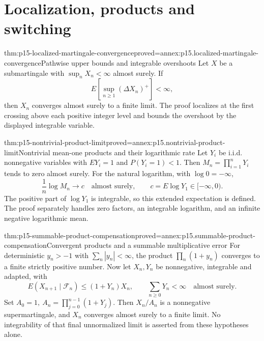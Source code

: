 \section{Localization, products and switching}
\label{sec:p15-martingale-refinements}

\begin{hbtheorem}{thm:p15-localized-martingale-convergence}{proved=annex:p15.localized-martingale-convergence}{Pathwise upper bounds and integrable overshoots}
Let \(X\) be a submartingale with \(\sup_nX_n<\infty\) almost surely.
If
\[
                             E\left[\sup_{n\geq1}(\Delta X_n)^+\right]<\infty,
\]
then \(X_n\) converges almost surely to a finite limit.
The proof localizes at the first crossing above each positive integer
level and bounds the overshoot by the displayed integrable variable.
\end{hbtheorem}

\begin{hbtheorem}{thm:p15-nontrivial-product-limit}{proved=annex:p15.nontrivial-product-limit}{Nontrivial mean-one products and their logarithmic rate}
Let \(Y_i\) be i.i.d. nonnegative variables with \(EY_i=1\) and
\(P(Y_i=1)<1\). Then \(M_n=\prod_{i=1}^nY_i\) tends to zero almost surely.
For the natural logarithm, with \(\log0=-\infty\),
\[
                         \frac1n\log M_n\longrightarrow c
                                      \quad\text{almost surely},
 \qquad c=E\log Y_1\in[-\infty,0).
\]
The positive part of \(\log Y_1\) is integrable, so this extended
expectation is defined. The proof separately handles zero factors,
an integrable logarithm, and an infinite negative logarithmic mean.
\end{hbtheorem}

\begin{hbtheorem}{thm:p15-summable-product-compensation}{proved=annex:p15.summable-product-compensation}{Convergent products and a summable multiplicative error}
For deterministic \(y_n>-1\) with \(\sum_n|y_n|<\infty\),
the product \(\prod_n(1+y_n)\) converges to a finite strictly positive number.
Now let \(X_n,Y_n\) be nonnegative, integrable and adapted, with
\[
                E(X_{n+1}\mid\mathcal F_n)\leq(1+Y_n)X_n,
                \qquad \sum_{n\geq0}Y_n<\infty\quad\text{almost surely}.
\]
Set \(A_0=1,\ A_n=\prod_{j=0}^{n-1}(1+Y_j)\).
Then \(X_n/A_n\) is a nonnegative supermartingale, and \(X_n\)
converges almost surely to a finite limit.
No integrability of that final unnormalized limit is asserted from
these hypotheses alone.
\end{hbtheorem}

